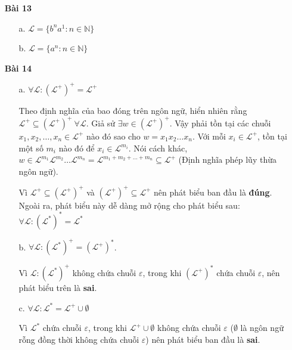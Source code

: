 \documentclass[12pt, a4paper]{article}
\begin{document}
\begin{itemize}
		\item[ \textbf{Bài 13} ]
		
			\begin{itemize}
				
				\item[a.] $\mathcal{L} = \{ b^na^1:n \in \mathbb{N} \}$
				\item[b.] $\mathcal{L} = \{ a^n:n \in \mathbb{N} \}$
				
			\end{itemize}
			
		\item[ \textbf{Bài 14} ]
		
		\begin{itemize}
		
			\item[a.] $\forall \mathcal{L}: (\mathcal{L}^+)^+ = \mathcal{L}^+$
			
			Theo định nghĩa của bao đóng trên ngôn ngữ, hiển nhiên rằng $\mathcal{L}^+ \subseteq (\mathcal{L}^+)^+ \ \forall \mathcal{L}$.
			Giả sử $\exists w \in (\mathcal{L}^+)^+$. Vậy phải tồn tại các chuỗi $x_1, x_2, \ldots, x_n \in \mathcal{L}^+$ nào đó sao cho $w = x_1x_2 \ldots x_n$. Với mỗi $x_i \in \mathcal{L}^+$, tồn tại một số $m_i$ nào đó để $x_i \in \mathcal{L}^{m_i}$. Nói cách khác, $w \in \mathcal{L}^{m_1}\mathcal{L}^{m_2} \ldots \mathcal{L}^{m_n} = \mathcal{L}^{m_1 + m_2 + \ldots + m_n} \subseteq \mathcal{L}^+$ (Định nghĩa phép lũy thừa ngôn ngữ).
			
			Vì $\mathcal{L}^+ \subseteq (\mathcal{L}^+)^+$ và $(\mathcal{L}^+)^+ \subseteq \mathcal{L}^+$ nên phát biểu ban đầu là \textbf{đúng}. Ngoài ra, phát biểu này dễ dàng mở rộng cho phát biểu sau: $\forall \mathcal{L}: (\mathcal{L}^*)^* = \mathcal{L}^*$
			
			\item[b.] $\forall \mathcal{L}: (\mathcal{L}^*)^+ = (\mathcal{L}^+)^*$.
			
			Vì $\mathcal{L}: (\mathcal{L}^*)^+$ không chứa chuỗi $\varepsilon$, trong khi $(\mathcal{L}^+)^*$ chứa chuỗi $\varepsilon$, nên phát biểu trên là \textbf{sai}.
			
			\item[c.] $\forall \mathcal{L}: \mathcal{L}^* = \mathcal{L}^+ \cup \emptyset$
			
			Vì $\mathcal{L}^*$ chứa chuỗi $\varepsilon$, trong khi $\mathcal{L}^+ \cup \emptyset$ không chứa chuỗi $\varepsilon$ ($\emptyset$ là ngôn ngữ rỗng đồng thời không chứa chuỗi $\varepsilon$) nên phát biểu ban đầu là \textbf{sai}.
			

\end{itemize}
\end{itemize}
\end{document}
